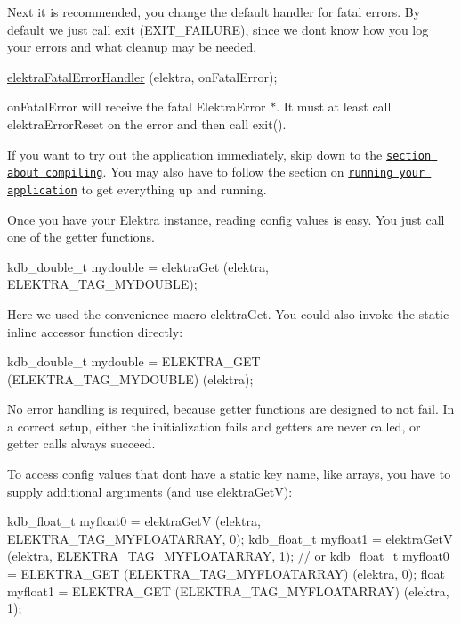 Next it is recommended, you change the default handler for fatal errors. By default we just call {\ttfamily exit (E\+X\+I\+T\+\_\+\+F\+A\+I\+L\+U\+RE)}, since we don\textquotesingle{}t know how you log your errors and what cleanup may be needed.


\begin{DoxyCode}
\hyperlink{group__highlevel_ga496441e9e1dd80ed14a239dfc4c08c40}{elektraFatalErrorHandler} (elektra, onFatalError);
\end{DoxyCode}


{\ttfamily on\+Fatal\+Error} will receive the fatal {\ttfamily Elektra\+Error $\ast$}. It must at least call {\ttfamily elektra\+Error\+Reset} on the error and then call {\ttfamily exit()}.

If you want to try out the application immediately, skip down to the \href{#compiling-your-application}{\tt section about compiling}. You may also have to follow the section on \href{#running-your-application}{\tt running your application} to get everything up and running.

Once you have your {\ttfamily Elektra} instance, reading config values is easy. You just call one of the getter functions.


\begin{DoxyCode}
kdb\_double\_t mydouble = elektraGet (elektra, ELEKTRA\_TAG\_MYDOUBLE);
\end{DoxyCode}


Here we used the convenience macro {\ttfamily elektra\+Get}. You could also invoke the {\ttfamily static inline} accessor function directly\+:


\begin{DoxyCode}
kdb\_double\_t mydouble = ELEKTRA\_GET (ELEKTRA\_TAG\_MYDOUBLE) (elektra);
\end{DoxyCode}


No error handling is required, because getter functions are designed to not fail. In a correct setup, either the initialization fails and getters are never called, or getter calls always succeed.

To access config values that don\textquotesingle{}t have a static key name, like arrays, you have to supply additional arguments (and use {\ttfamily elektra\+GetV})\+:


\begin{DoxyCode}
kdb\_float\_t myfloat0 = elektraGetV (elektra, ELEKTRA\_TAG\_MYFLOATARRAY, 0);
kdb\_float\_t myfloat1 = elektraGetV (elektra, ELEKTRA\_TAG\_MYFLOATARRAY, 1);
\textcolor{comment}{// or}
kdb\_float\_t myfloat0 = ELEKTRA\_GET (ELEKTRA\_TAG\_MYFLOATARRAY) (elektra, 0);
\textcolor{keywordtype}{float} myfloat1 = ELEKTRA\_GET (ELEKTRA\_TAG\_MYFLOATARRAY) (elektra, 1);
\end{DoxyCode}


